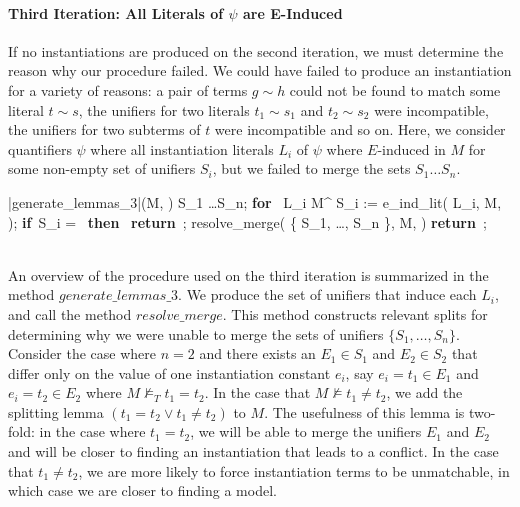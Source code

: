\documentclass{llncs}
\def\IF{\qtab\keyword{if}\ }
\def\THEN{\ \keyword{then}\ }
\def\FI{\untab}
\def\RETURN{\keyword{return}\ }
\def\ENDPROC{\untab}
\def\DOFOR{\qtab\keyword{for}\ }
\def\ENDFOR{\untab}
\def\keyword#1{\mbox{\normalshape\bf #1}}
\begin{document}
\paragraph{Third Iteration: All Literals of $\psi$ are E-Induced}

If no instantiations are produced on the second iteration, we must determine the reason why our procedure failed.
We could have failed to produce an instantiation for a variety of reasons: a pair of terms $g \sim h$ could not be found to match some literal $t \sim s$, the unifiers for two literals $t_1 \sim s_1$ and $t_2 \sim s_2$ were incompatible, the unifiers for two subterms of $t$ were incompatible and so on.
Here, we consider quantifiers $\psi$ where all instantiation literals $L_i$ of $\psi$ where $E$-induced in $M$ for some non-empty set of unifiers $S_i$, but we failed to merge the sets $S_1 \ldots S_n$.

\begin{minipage}[t]{.4\linewidth}
\begin{program}
\PROC |generate\_lemmas\_3|(M, \psi) \BODY
  S_1 \ldots S_n;
  \DOFOR {} L_i \in M^\psi
    S_i := e\_ind\_lit( L_i, M, \psi );
    \IF S_i = \emptyset \THEN
      \RETURN;
    \FI
  \ENDFOR
  resolve\_merge( \{ S_1, \ldots, S_n \}, M, \psi )
  \RETURN;
\ENDPROC
\end{program}
\end{minipage}

\ \\

An overview of the procedure used on the third iteration is summarized in the method $generate\_lemmas\_3$.
We produce the set of unifiers that induce each $L_i$, and call the method $resolve\_merge$.
This method constructs relevant splits for determining why we were unable to merge the sets of unifiers $\{ S_1, \ldots, S_n \}$.
Consider the case where $n = 2$ and there exists an $E_1 \in S_1$ and $E_2 \in S_2$ that differ only on the value of one instantiation constant $e_i$, say $e_i = t_1 \in E_1$ and $e_i = t_2 \in E_2$ where $M \not\models_T t_1 = t_2$.
In the case that $M \not\models t_1 \neq t_2$, we add the splitting lemma $( t_1 = t_2 \vee t_1 \neq t_2 )$ to $M$.
The usefulness of this lemma is two-fold: in the case where $t_1 = t_2$, we will be able to merge the unifiers $E_1$ and $E_2$ and will be closer to finding an instantiation that leads to a conflict.
In the case that $t_1 \neq t_2$, we are more likely to force instantiation terms to be unmatchable, in which case we are closer to finding a model.
\end{document}
